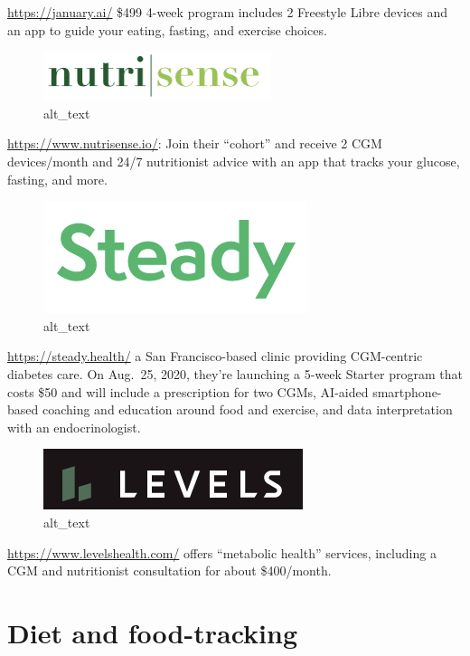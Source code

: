\documentclass[
]{book}
\begin{document}
\url{https://january.ai/} \$499 4-week program includes 2 Freestyle Libre devices and an app to guide your eating, fasting, and exercise choices.

\begin{figure}
\centering
\includegraphics{images/nutrisense-logo.png}
\caption{alt\_text}
\end{figure}

\url{https://www.nutrisense.io/}: Join their ``cohort'' and receive 2 CGM devices/month and 24/7 nutritionist advice with an app that tracks your glucose, fasting, and more.

\begin{figure}
\centering
\includegraphics{images/steadyhealth-logo.png}
\caption{alt\_text}
\end{figure}

\url{https://steady.health/} a San Francisco-based clinic providing CGM-centric diabetes care. On Aug.~25, 2020, they're launching a 5-week Starter program that costs \$50 and will include a prescription for two CGMs, AI-aided smartphone-based coaching and education around food and exercise, and data interpretation with an endocrinologist.

\begin{figure}
\centering
\includegraphics{images/levelshealth-logo.png}
\caption{alt\_text}
\end{figure}

\url{https://www.levelshealth.com/} offers ``metabolic health'' services, including a CGM and nutritionist consultation for about \$400/month.

\hypertarget{diet-and-food-tracking}{%
\chapter{Diet and food-tracking}\label{diet-and-food-tracking}}
\end{document}

